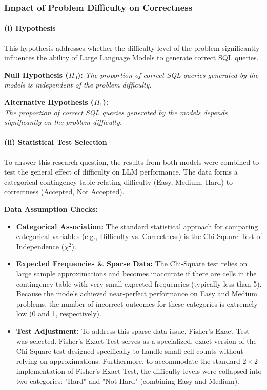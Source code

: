 \documentclass[11pt,a4paper]{article}
\begin{document}
    \subsubsection{Impact of Problem Difficulty on Correctness}

    \paragraph{(i) Hypothesis}
    \quad

    This hypothesis addresses whether the difficulty level of the problem significantly influences the ability of Large Language Models to generate correct SQL queries.

    \textbf{Null Hypothesis ($H_0$):}
    \textit{The proportion of correct SQL queries generated by the models is independent of the problem difficulty.}

    \textbf{Alternative Hypothesis ($H_1$):} \\
    \textit{The proportion of correct SQL queries generated by the models depends significantly on the problem difficulty.}

    \paragraph{(ii) Statistical Test Selection}
    \quad

    To answer this research question, the results from both models were combined to test the general effect of difficulty on LLM performance. The data forms a categorical contingency table relating difficulty (Easy, Medium, Hard) to correctness (Accepted, Not Accepted). 

    \textbf{Data Assumption Checks:}
    \begin{itemize}
        \item \textbf{Categorical Association:} The standard statistical approach for comparing categorical variables (e.g., Difficulty vs. Correctness) is the Chi-Square Test of Independence ($\chi^2$).
        \item \textbf{Expected Frequencies \& Sparse Data:} The Chi-Square test relies on large sample approximations and becomes inaccurate if there are cells in the contingency table with very small expected frequencies (typically less than 5). Because the models achieved near-perfect performance on Easy and Medium problems, the number of incorrect outcomes for these categories is extremely low (0 and 1, respectively).
        \item \textbf{Test Adjustment:} To address this sparse data issue, Fisher's Exact Test was selected. Fisher's Exact Test serves as a specialized, exact version of the Chi-Square test designed specifically to handle small cell counts without relying on approximations. Furthermore, to accommodate the standard $2 \times 2$ implementation of Fisher's Exact Test, the difficulty levels were collapsed into two categories: "Hard" and "Not Hard" (combining Easy and Medium).
    \end{itemize}
\end{document}

